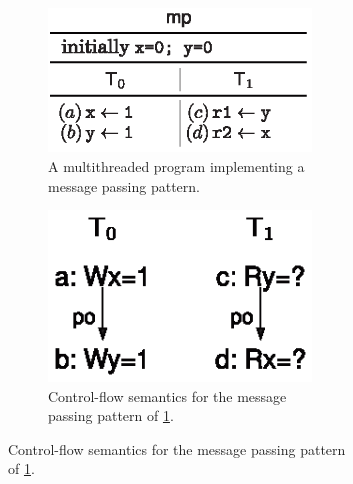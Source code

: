 \documentclass[acmsmall]{acmart}
\begin{document}
\begin{figure}[H]
    \centering
    \begin{subfigure}[b]{0.3\linewidth}
        \centering
        \begin{subfigure}[b]{\linewidth}
            \centering
            \includegraphics[width=\linewidth]{images/mp.eps}
            \caption{A multithreaded program implementing a message passing pattern.}
            \label{fig:original-program}
        \end{subfigure}
        \vfill
        \begin{subfigure}[b]{\linewidth}
            \centering
            \includegraphics[width=0.8\linewidth]{images/mp_control.eps}
            \caption{Control-flow semantics for the message passing pattern of \ref{fig:original-program}.}
            \label{fig:control-flow}
        \end{subfigure}
    \end{subfigure}
    \hspace{10pt} %
    \begin{subfigure}[b]{0.5\linewidth}
        \centering

\end{subfigure}
\end{figure}
\end{document}
